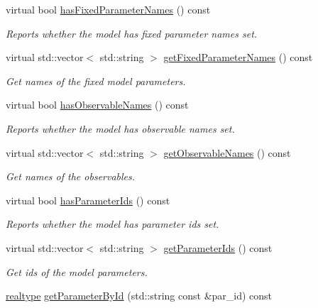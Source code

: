 \begin{DoxyCompactItemize}
virtual bool \mbox{\hyperlink{classamici_1_1_model_adfe23b552732bba8d8f54298522abf3c}{has\+Fixed\+Parameter\+Names}} () const
\begin{DoxyCompactList}\small\item\em Reports whether the model has fixed parameter names set. \end{DoxyCompactList}\item 
virtual std\+::vector$<$ std\+::string $>$ \mbox{\hyperlink{classamici_1_1_model_abdfc1bad63f4c3b927aac8c3422d639a}{get\+Fixed\+Parameter\+Names}} () const
\begin{DoxyCompactList}\small\item\em Get names of the fixed model parameters. \end{DoxyCompactList}\item 
virtual bool \mbox{\hyperlink{classamici_1_1_model_aee41b755785a17eda8e67ec1462638b4}{has\+Observable\+Names}} () const
\begin{DoxyCompactList}\small\item\em Reports whether the model has observable names set. \end{DoxyCompactList}\item 
virtual std\+::vector$<$ std\+::string $>$ \mbox{\hyperlink{classamici_1_1_model_aeac93945b3985b2c3a7c153bdb07679f}{get\+Observable\+Names}} () const
\begin{DoxyCompactList}\small\item\em Get names of the observables. \end{DoxyCompactList}\item 
virtual bool \mbox{\hyperlink{classamici_1_1_model_a2bd3836db435507277d0e5c9fa139cb9}{has\+Parameter\+Ids}} () const
\begin{DoxyCompactList}\small\item\em Reports whether the model has parameter ids set. \end{DoxyCompactList}\item 
virtual std\+::vector$<$ std\+::string $>$ \mbox{\hyperlink{classamici_1_1_model_a2c3cf99676168a01fccf6f4217f85297}{get\+Parameter\+Ids}} () const
\begin{DoxyCompactList}\small\item\em Get ids of the model parameters. \end{DoxyCompactList}\item 
\mbox{\hyperlink{namespaceamici_a1bdce28051d6a53868f7ccbf5f2c14a3}{realtype}} \mbox{\hyperlink{classamici_1_1_model_a4436bd89ae2cb032cbf13db478d99e15}{get\+Parameter\+By\+Id}} (std\+::string const \&par\+\_\+id) const

\end{DoxyCompactItemize}
